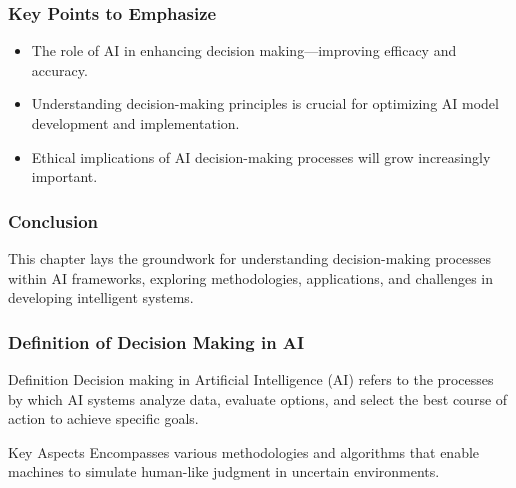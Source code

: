 \documentclass[aspectratio=169]{beamer}
\begin{document}
\begin{frame}[fragile]
    \frametitle{Key Points to Emphasize}
    \begin{itemize}
        \item The role of AI in enhancing decision making—improving efficacy and accuracy.
        \item Understanding decision-making principles is crucial for optimizing AI model development and implementation.
        \item Ethical implications of AI decision-making processes will grow increasingly important.
    \end{itemize}
\end{frame}

\begin{frame}[fragile]
    \frametitle{Conclusion}
    This chapter lays the groundwork for understanding decision-making processes within AI frameworks, exploring methodologies, applications, and challenges in developing intelligent systems.
\end{frame}

\begin{frame}[fragile]
    \titlepage
\end{frame}

\begin{frame}[fragile]
    \frametitle{Definition of Decision Making in AI}
    \begin{block}{Definition}
        Decision making in Artificial Intelligence (AI) refers to the processes by which AI systems analyze data, evaluate options, and select the best course of action to achieve specific goals.
    \end{block}
    \begin{block}{Key Aspects}
        Encompasses various methodologies and algorithms that enable machines to simulate human-like judgment in uncertain environments.
    \end{block}
\end{frame}
\end{document}
